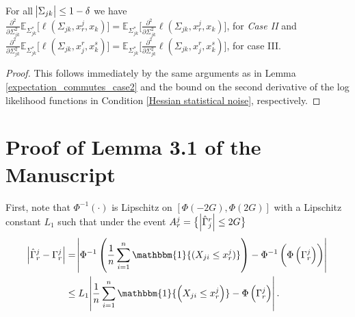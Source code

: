 \begin{corollary}\label{expectation_commutes_case3}
    For all $\abs{\Sigma_{jk}} \leq 1-\delta$ we have \\
        $\frac{\partial^2 }{\partial \Sigma_{jk}^2} \mathbb{E}_{\Sigma_{jk}^*} \big[\ell(\Sigma_{jk}, x_r^j,x_k)\big] = \mathbb{E}_{\Sigma_{jk}^*} \Bigg[\frac{\partial^2 }{\partial \Sigma_{jk}^2} \ell(\Sigma_{jk}, x_r^j,x_k) \Bigg]$, for \textit{Case II} and \\
        $\frac{\partial^2 }{\partial \Sigma_{jk}^2} \mathbb{E}_{\Sigma_{jk}^*} \big[\ell(\Sigma_{jk}, x_j^r,x_k^s)\big] = \mathbb{E}_{\Sigma_{jk}^*} \Bigg[\frac{\partial^2 }{\partial \Sigma_{jk}^2} \ell(\Sigma_{jk}, x_j^r,x_k^s) \Bigg]$, for case III.
    
    \begin{proof}
        This follows immediately by the same arguments as in Lemma \ref{expectation_commutes_case2} and the bound on the second derivative of the log likelihood functions in Condition \ref{Hessian statistical noise}, respectively. 
    \end{proof}
\end{corollary}

\section{Proof of Lemma 3.1 of the Manuscript %
}\label{lemma_threshold_proof}

First, note that $\Phi^{-1}(\cdot)$ is Lipschitz on $[\Phi(-2G),\Phi(2G)]$ with a Lipschitz constant $L_1$ such that under the event $A_r^j = \big\{\abs{\hat{\Gamma}_j^r} \leq 2G\big\}$
\begin{equation*}
    \begin{split}
        \abs{\hat{\Gamma}_r^j - \Gamma_r^j} &= \abs{\Phi^{-1}\left(\frac{1}{n} \sum_{i=1}^n \mathbbm{1}{(X_{ji} \leq x_r^j)}\right) - \Phi^{-1}\left(\Phi\left(\Gamma_r^j\right)\right)} \\
        &\leq L_1\abs{\frac{1}{n} \sum_{i=1}^n \mathbbm{1}{\left(X_{ji} \leq x_r^j\right)} - \Phi\left(\Gamma_r^j\right)}.
    \end{split}
\end{equation*}

